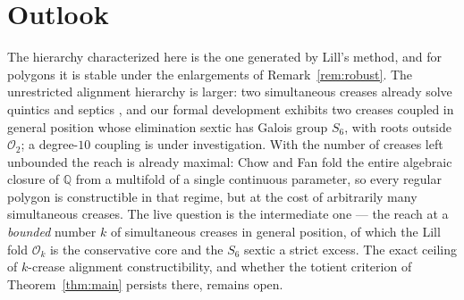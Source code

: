 \documentclass[11pt]{amsart}
\theoremstyle{plain}
\theoremstyle{definition}
\newcommand{\Ok}{\mathscr{O}_k}
\newcommand{\Onum}[1]{\mathscr{O}_{#1}}
\newcommand{\Q}{\mathbb{Q}}
\begin{document}
\section{Outlook}\label{sec:outlook}

The hierarchy characterized here is the one generated by Lill's method, and for polygons it is stable under the enlargements of Remark~\ref{rem:robust}. The unrestricted alignment hierarchy is larger: two simultaneous creases already solve quintics and septics \cite{nishimura, koenig, luceroquintic}, and our formal development exhibits two creases coupled in general position whose elimination sextic has Galois group $S_6$, with roots outside $\Onum{2}$; a degree-$10$ coupling is under investigation. With the number of creases left unbounded the reach is already maximal: Chow and Fan \cite{chowfan} fold the entire algebraic closure of $\Q$ from a multifold of a single continuous parameter, so every regular polygon is constructible in that regime, but at the cost of arbitrarily many simultaneous creases. The live question is the intermediate one --- the reach at a \emph{bounded} number $k$ of simultaneous creases in general position, of which the Lill fold $\Ok$ is the conservative core and the $S_6$ sextic a strict excess. The exact ceiling of $k$-crease alignment constructibility, and whether the totient criterion of Theorem~\ref{thm:main} persists there, remains open.
\end{document}
